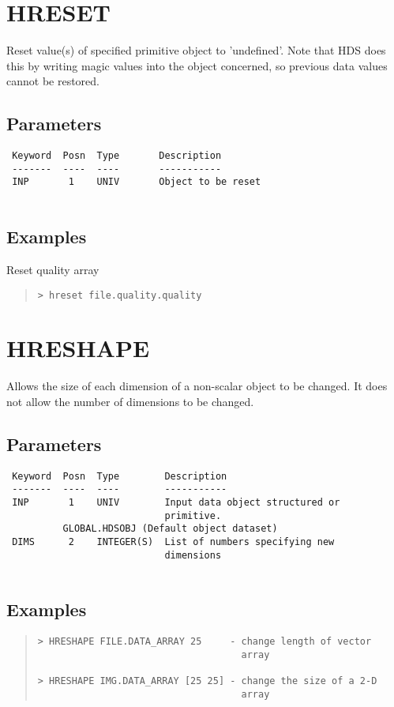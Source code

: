 \documentclass{book}
\renewcommand{\_}{{\tt\char'137}}     %
\begin{document}
\section{HRESET}
Reset value(s) of specified primitive object to 'undefined'.
Note that HDS does this by writing magic values into the object
concerned, so previous data values cannot be restored.
 
\subsection{Parameters}
\begin{verbatim}
 Keyword  Posn  Type       Description
 -------  ----  ----       -----------
 INP       1    UNIV       Object to be reset
 
\end{verbatim}\subsection{Examples}
Reset quality array
\begin{quote}\begin{verbatim}
> hreset file.quality.quality
\end{verbatim}\end{quote}
\section{HRESHAPE}
Allows the size of each dimension of a non-scalar object to be
changed. It does not allow the number of dimensions to be
changed.
 
\subsection{Parameters}
\begin{verbatim}
 Keyword  Posn  Type        Description
 -------  ----  ----        -----------
 INP       1    UNIV        Input data object structured or
                            primitive.
          GLOBAL.HDSOBJ (Default object dataset)
 DIMS      2    INTEGER(S)  List of numbers specifying new
                            dimensions
 
\end{verbatim}\subsection{Examples}
\begin{quote}\begin{verbatim}
> HRESHAPE FILE.DATA_ARRAY 25     - change length of vector
                                    array
 
> HRESHAPE IMG.DATA_ARRAY [25 25] - change the size of a 2-D
                                    array
\end{verbatim}\end{quote}
\end{document}
